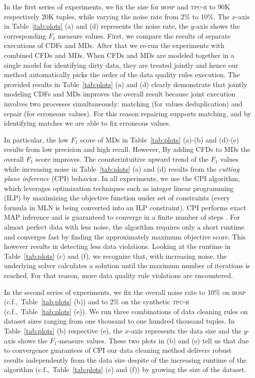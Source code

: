 In the first series of experiments, we fix the size for \textsc{hosp} and \textsc{tpc-h} to $90$K respectively $20$K tuples, while varying the noise rate from $2\%$ to $10\%$. The $x$-axis in Table~\ref{tab:plots} (a) and (d) represents the noise rate, the $y$-axis shows the corresponding $F_1$ measure values. First, we compare the results of separate executions of CDFs and MDs. After that we re-run the experiments with combined CFDs and MDs. When CFDs and MDs are modeled together in a single model for identifying dirty data, they are treated jointly and hence our method automatically picks the order of the data quality rules execution. The provided results in Table~\ref{tab:plots} (a) and (d) clearly demonstrate that jointly modeling CDFs and MDs improves the overall result because joint execution involves two processes simultaneously: matching (for values deduplication) and repair (for erroneous values). For this reason repairing supports matching, and by identifying matches we are able to fix erroneous values.

In particular, the low $F_1$ score of MDs in Table~\ref{tab:plots} (a)-(b) and (d)-(e) results from low precision and high recall. However, By adding CFDs to MDs the overall $F_1$ score improves. The counterintuitive upward trend of the $F_1$ values while increasing noise in Table~\ref{tab:plots} (a) and (d) results from the \textit{cutting plane inference} (CPI) \cite{riedel08improving} behavior. In all experiments, we use the CPI algorithm, which leverages optimization techniques such as integer linear programming (ILP) \cite{riedel08improving, NoessnerNS13} by maximizing the objective function under set of constraints (every formula in MLN is being converted into an ILP constraint). CPI performs exact MAP inference and is guaranteed to converge in a finite number of steps \cite{riedel08improving}. For almost perfect data with less noise, the algorithm requires only a short runtime and converges fast by finding the approximately maximum objective score. This however results in detecting less data violations. Looking at the runtime in Table~\ref{tab:plots} (c) and (f), we recognize that,  with increasing noise, the underlying solver calculates a solution until the maximum number of iterations is reached. For that reason, more data quality rule violations are encountered. 

In the second series of experiments, we fix the overall noise rate to 10\% on \textsc{hosp} (c.f.,~Table~\ref{tab:plots} (b)) and to 2\% on the synthetic \textsc{tpc-h} (c.f.,~Table~\ref{tab:plots} (e)). We run three combinations of data cleaning rules on dataset sizes ranging from one thousand to one hundred thousand tuples. In Table~\ref{tab:plots} (b) respective (e), the $x$-axis represents the data size and the $y$-axis shows the $F_1$-measure values. These two plots in (b) and (e) tell us that due to convergence guarantees of CPI our data cleaning method delivers robust results independently from the data size despite of the increasing runtime of the algorithm (c.f.,~Table~\ref{tab:plots} (c) and (f)) by growing the size of the dataset.

